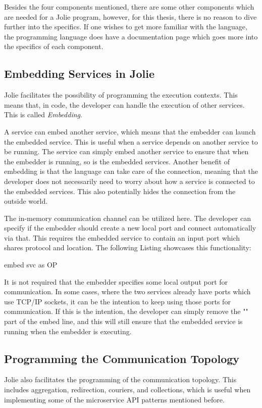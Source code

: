 Besides the four components mentioned, there are some other components which are needed for a Jolie program, however, for this thesis, there is no reason to dive further into the specifics.
If one wishes to get more familiar with the language, the programming language does have a documentation page which goes more into the specifics of each component.

\subsection{Embedding Services in Jolie}
Jolie facilitates the possibility of programming the execution contexts.
This means that, in code, the developer can handle the execution of other services. This is called \emph{Embedding}.

A service can embed another service, which means that the embedder can launch the embedded service. This is useful when a service depends on another service to be running.
The service can simply embed another service to ensure that when the embedder is running, so is the embedded services.
Another benefit of embedding is that the language can take care of the connection, meaning that the developer does not necessarily need to worry about how a service is connected to the embedded services.
This also potentially hides the connection from the outside world.

The in-memory communication channel can be utilized here. The developer can specify if the embedder should create a new local port and connect automatically via that. This requires the embedded service to contain an input port which shares protocol and location.
The following Listing showcases this functionality:

\begin{jolisting}[][caption={
    }, label=lst:embed-as]
embed svc as OP
\end{jolisting}

It is not required that the embedder specifies some local output port for communication. In some cases, where the two services already have ports which use TCP/IP sockets,
it can be the intention to keep using those ports for communication. If this
is the intention, the developer can simply remove the "" part of the embed line, and this will still ensure that the embedded service is running when the embedder is executing.

\subsection{Programming the Communication Topology}
Jolie also facilitates the programming of the communication topology. This includes aggregation, redirection, couriers, and collections, which is useful when 
implementing some of the microservice API patterns mentioned before.
